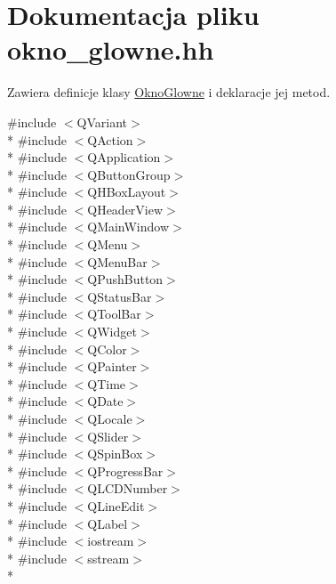 \hypertarget{okno__glowne_8hh}{}\section{Dokumentacja pliku okno\+\_\+glowne.\+hh}
\label{okno__glowne_8hh}


Zawiera definicje klasy \hyperlink{class_okno_glowne}{Okno\+Glowne} i deklaracje jej metod.  


{\ttfamily \#include $<$Q\+Variant$>$}\\*
{\ttfamily \#include $<$Q\+Action$>$}\\*
{\ttfamily \#include $<$Q\+Application$>$}\\*
{\ttfamily \#include $<$Q\+Button\+Group$>$}\\*
{\ttfamily \#include $<$Q\+H\+Box\+Layout$>$}\\*
{\ttfamily \#include $<$Q\+Header\+View$>$}\\*
{\ttfamily \#include $<$Q\+Main\+Window$>$}\\*
{\ttfamily \#include $<$Q\+Menu$>$}\\*
{\ttfamily \#include $<$Q\+Menu\+Bar$>$}\\*
{\ttfamily \#include $<$Q\+Push\+Button$>$}\\*
{\ttfamily \#include $<$Q\+Status\+Bar$>$}\\*
{\ttfamily \#include $<$Q\+Tool\+Bar$>$}\\*
{\ttfamily \#include $<$Q\+Widget$>$}\\*
{\ttfamily \#include $<$Q\+Color$>$}\\*
{\ttfamily \#include $<$Q\+Painter$>$}\\*
{\ttfamily \#include $<$Q\+Time$>$}\\*
{\ttfamily \#include $<$Q\+Date$>$}\\*
{\ttfamily \#include $<$Q\+Locale$>$}\\*
{\ttfamily \#include $<$Q\+Slider$>$}\\*
{\ttfamily \#include $<$Q\+Spin\+Box$>$}\\*
{\ttfamily \#include $<$Q\+Progress\+Bar$>$}\\*
{\ttfamily \#include $<$Q\+L\+C\+D\+Number$>$}\\*
{\ttfamily \#include $<$Q\+Line\+Edit$>$}\\*
{\ttfamily \#include $<$Q\+Label$>$}\\*
{\ttfamily \#include $<$iostream$>$}\\*
{\ttfamily \#include $<$sstream$>$}\\*
